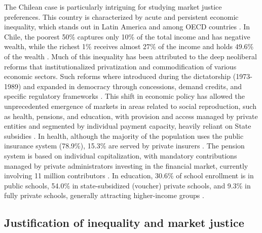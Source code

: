 \documentclass[
    behavsci,
    article,
    submit,
moreauthors
]{mdpi}
\begin{document}
The Chilean case is particularly intriguing for studying market justice
preferences. This country is characterized by acute and persistent
economic inequality, which stands out in Latin America and among OECD
countries \citep{flores_top_2020}. In Chile, the poorest 50\% captures
only 10\% of the total income and has negative wealth, while the richest
1\% receives almost 27\% of the income and holds 49.6\% of the wealth
\citep{chancel_world_2022}. Much of this inequality has been attributed
to the deep neoliberal reforms that institutionalized privatization and
commodification of various economic sectors. Such reforms where
introduced during the dictatorship (1973-1989) and expanded in democracy
through concessions, demand credits, and specific regulatory frameworks
\citep{ffrench-davis_reformas_2018}. This shift in economic policy has
allowed the unprecedented emergence of markets in areas related to
social reproduction, such as health, pensions, and education, with
provision and access managed by private entities and segmented by
individual payment capacity, heavily reliant on State subsidies
\citep{boccardo_30_2020}. In health, although the majority of the
population uses the public insurance system (78.9\%), 15.3\% are served
by private insurers \citep{observatoriosocial_estadisticas_2024}. The
pension system is based on individual capitalization, with mandatory
contributions managed by private administrators investing in the
financial market, currently involving 11 million contributors
\citep{superintendenciadepensiones_estadisticas_2024}. In education,
30.6\% of school enrollment is in public schools, 54.0\% in
state-subsidized (voucher) private schools, and 9.3\% in fully private
schools, generally attracting higher-income groups
\citep{ministeriodeeducacion_resumen_2023}.

\subsection{Justification of inequality and market
justice}\label{justification-of-inequality-and-market-justice}
\end{document}
